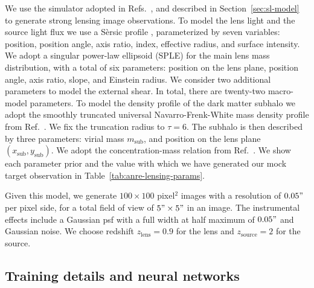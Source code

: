 \begin{subappendices}
We use the simulator adopted in Refs.~\cite{Coogan:2020yux, Coogan:2022cky, Montel:2022fhv}, and described in Section~\ref{sec:sl-model} to generate strong lensing image observations. To model the lens light and the source light flux we use a Sèrsic profile \cite{Sersic:1963aa}, parameterized by seven variables: position, position angle, axis ratio, index, effective radius, and surface intensity. We adopt a singular power-law ellipsoid (SPLE) \cite{Suyu:2008zp} for the main lens mass distribution, with a total of six parameters: position on the lens plane, position angle, axis ratio, slope, and Einstein radius. We consider two additional parameters to model the external shear. In total, there are twenty-two macro-model parameters. To model the density profile of the dark matter subhalo we adopt the smoothly truncated universal Navarro-Frenk-White mass density profile from Ref.~\cite{Baltz:2007vq}. We fix the truncation radius to $\tau=6$. The subhalo is then described by three parameters: virial mass $m_\mathrm{sub}$, and position on the lens plane $(x_\mathrm{sub}, y_\mathrm{sub})$. We adopt the concentration-mass relation from Ref.~\cite{Correa:2015dva}. We show each parameter prior and the value with which we have generated our mock target observation in Table~\ref{tab:anre-lensing-params}.

Given this model, we generate $100 \times 100$ pixel$^2$ images with a resolution of $0.05"$ per pixel side, for a total field of view of $5" \times 5"$ in an image. The instrumental effects include a Gaussian \gls*{psf} with a full width at half maximum of $0.05"$ and Gaussian noise. We choose redshift $z_\mathrm{lens}=0.9$ for the lens and $z_\mathrm{source}=2$ for the source.

\subsection{Training details and neural networks}


\end{subappendices}
